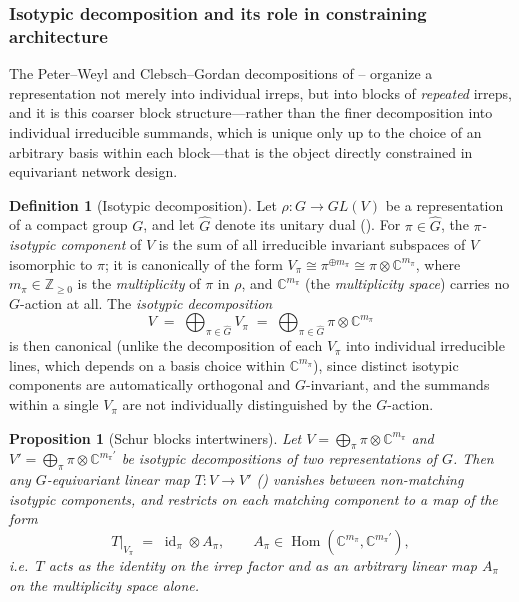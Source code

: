 \documentclass[11pt]{article}
\theoremstyle{plain}
\newtheorem{Proposition}{Proposition}[section]
\theoremstyle{definition}
\newtheorem{Definition}{Definition}[section]
\begin{document}

\subsubsection{Isotypic decomposition and its role in constraining architecture}\label{sec:isotypic-decomposition}

The Peter--Weyl and Clebsch--Gordan decompositions of
-- organize a
representation not merely into individual irreps, but into blocks of
\emph{repeated} irreps, and it is this coarser block structure---rather than
the finer decomposition into individual irreducible summands, which is
unique only up to the choice of an arbitrary basis within each block---that
is the object directly constrained in equivariant network design.

\begin{Definition}[Isotypic decomposition]
\label{def:isotypic-decomposition}
Let $\rho : G \to GL(V)$ be a representation of a compact group $G$, and let
$\widehat{G}$ denote its unitary dual (). For
$\pi \in \widehat{G}$, the \emph{$\pi$-isotypic component} of $V$ is the sum
of all irreducible invariant subspaces of $V$ isomorphic to $\pi$; it is
canonically of the form $V_\pi \cong \pi^{\oplus m_\pi} \cong \pi \otimes
\mathbb{C}^{m_\pi}$, where $m_\pi \in \mathbb{Z}_{\geq 0}$ is the
\emph{multiplicity} of $\pi$ in $\rho$, and $\mathbb{C}^{m_\pi}$ (the
\emph{multiplicity space}) carries no $G$-action at all. The
\emph{isotypic decomposition}
\[
    V \;=\; \bigoplus_{\pi \in \widehat{G}} V_\pi \;=\; \bigoplus_{\pi \in \widehat{G}} \pi \otimes \mathbb{C}^{m_\pi}
\]
is then canonical (unlike the decomposition of each $V_\pi$ into individual
irreducible lines, which depends on a basis choice within
$\mathbb{C}^{m_\pi}$), since distinct isotypic components are automatically
orthogonal and $G$-invariant, and the summands within a single $V_\pi$ are
not individually distinguished by the $G$-action.
\end{Definition}

\begin{Proposition}[Schur blocks intertwiners]
\label{prop:schur-blocks}
Let $V = \bigoplus_\pi \pi \otimes \mathbb{C}^{m_\pi}$ and
$V' = \bigoplus_\pi \pi \otimes \mathbb{C}^{m_\pi'}$ be isotypic
decompositions of two representations of $G$. Then any $G$-equivariant
linear map $T : V \to V'$ ()
vanishes between non-matching isotypic components, and restricts on each
matching component to a map of the form
\[
    T\big|_{V_\pi} \;=\; \operatorname{id}_\pi \otimes A_\pi, \qquad A_\pi \in \operatorname{Hom}(\mathbb{C}^{m_\pi}, \mathbb{C}^{m_\pi'}),
\]
i.e.\ $T$ acts as the identity on the irrep factor and as an
\emph{arbitrary} linear map $A_\pi$ on the multiplicity space alone.
\end{Proposition}
\end{document}
